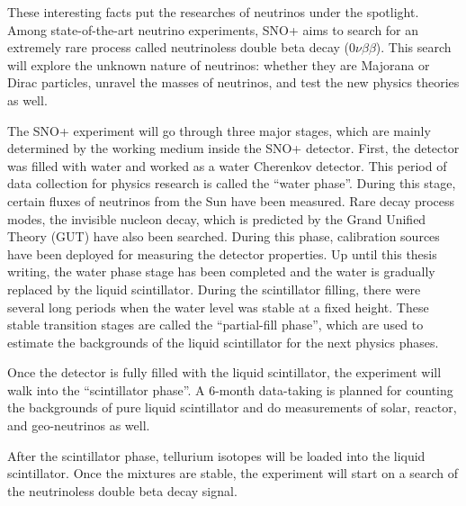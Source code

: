 These interesting facts put the researches of neutrinos under the spotlight. Among state-of-the-art neutrino experiments, SNO+ aims to search for an extremely rare process called neutrinoless double beta decay ($0\nu\beta\beta$). This search will explore the unknown nature of neutrinos: whether they are Majorana or Dirac particles, unravel the masses of neutrinos, and test the new physics theories as well.

The SNO+ experiment will go through three major stages, which are mainly determined by the working medium inside the SNO+ detector. First, the detector was filled with water and worked as a water Cherenkov detector. This period of data collection for physics research is called the ``water phase''. During this stage, certain fluxes of neutrinos from the Sun have been measured. Rare decay process modes, the invisible nucleon decay, which is predicted by the Grand Unified Theory (GUT) have also been searched. During this phase, calibration sources have been deployed for measuring the detector properties. Up until this thesis writing, the water phase stage has been completed and the water is gradually replaced by the liquid scintillator. During the scintillator filling, there were several long periods when the water level was stable at a fixed height. These stable transition stages are called the ``partial-fill phase'', which are used to estimate the backgrounds of the liquid scintillator for the next physics phases.

Once the detector is fully filled with the liquid scintillator, the experiment will walk into the ``scintillator phase''. A 6-month data-taking is planned for counting the backgrounds of pure liquid scintillator and do measurements of solar, reactor, and geo-neutrinos as well\cite{directorReview}. 

After the scintillator phase, tellurium isotopes will be loaded into the liquid scintillator. Once the mixtures are stable, the experiment will start on a search of the neutrinoless double beta decay signal.

